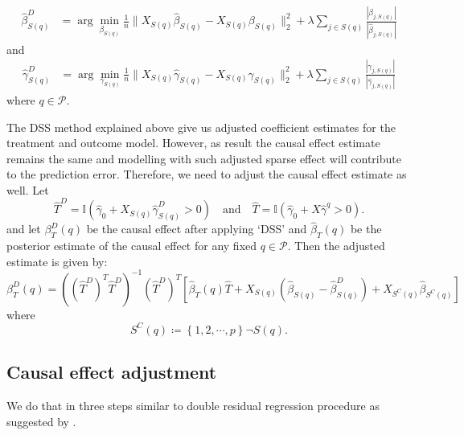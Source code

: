 \documentclass[oribibl]{llncs}
\begin{document}
\begin{align}
	\hat{\beta}^D_{S(q)} &= 
	\arg\min_{\beta_{S(q)}} \frac{1}{n}\|X_{S(q)}\hat{\beta}_{S(q)}
	- X_{S(q)} \beta_{S(q)}\|_2^2 + \lambda\sum_{j\in S(q)} 
	\frac{|\beta_{j,S(q)}|}{|\hat{\beta}_{j,S(q)}|}
\end{align}
and
\begin{align}
	\hat{\gamma}^D_{S(q)} &= 
	\arg\min_{\gamma_{S(q)}} \frac{1}{n}\|X_{S(q)}\hat{\gamma}_{S(q)}
	- X_{S(q)} \gamma_{S(q)}\|_2^2 + \lambda\sum_{j\in S(q)} 
	\frac{|\gamma_{j,S(q)}|}{|\hat{\gamma}_{j,S(q)}|}
\end{align}
where $q\in \mathcal{P}$.

The DSS method explained
above give us adjusted coefficient estimates for the treatment
and outcome model. However, as result the causal effect estimate
remains the same and modelling with such adjusted sparse effect 
will contribute to the prediction error. Therefore, we need to 
adjust the causal effect estimate as well. Let
\begin{equation}
    \hat{T}^D = \mathbb{I}\left(\hat{\gamma}_0+X_{S(q)}\hat{\gamma}^D_{S(q)} >0\right)
    \quad\text{and}\quad
    \hat{T} = \mathbb{I}\left(\hat{\gamma}_0+X\hat{\gamma}^q >0\right).
\end{equation}
and let $\beta_{T}^D(q)$
be the causal effect after applying `DSS' and $\hat{\beta}_{T}(q)$ be the
posterior estimate of the causal effect for any fixed $q\in\mathcal{P}$. Then
the adjusted estimate is given by:
\begin{equation}
    \beta_{T}^D(q) = \left(\left(\hat{T}^D\right)^T \hat{T}^D\right)^{-1}
    \left(\hat{T}^D\right)^T \left[\hat{\beta}_{T}(q)\hat{T} 
    + X_{S(q)}\left(\hat{\beta}_{S(q)} - \hat{\beta}^D_{S(q)}\right) 
    +X_{S^C(q)}\hat{\beta}_{S^C(q)}\right]
\end{equation}
where
\begin{equation}
    S^C(q)\coloneqq \left\{1,2,\cdots, p\right\} \neg S(q).
\end{equation}

\iffalse
\subsection{Causal effect adjustment}  We do that in three steps
similar to double residual regression procedure as suggested by
\cite{robinson1988}.
\end{document}
